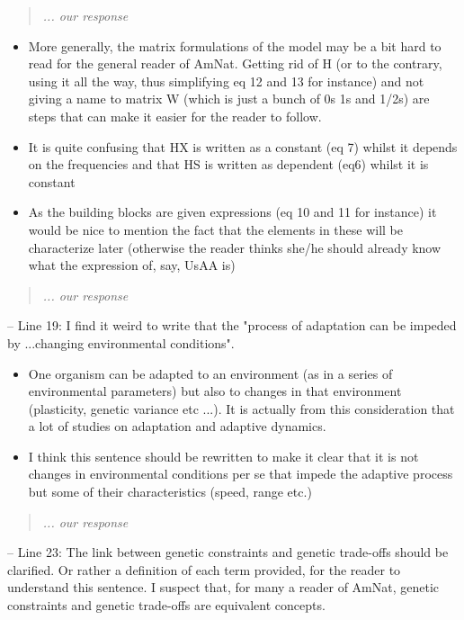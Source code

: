 \documentclass[11pt]{article}
\begin{document}
\begin{quote}
	{\itshape ... our response}
\end{quote}


\begin{itemize}
	\item More generally, the matrix formulations of the model may be a bit hard to read for the general reader of AmNat. Getting rid of H (or to the contrary, using it all the way, thus simplifying eq 12 and 13 for instance) and not giving a name to matrix W (which is just a bunch of 0s 1s and 1/2s) are steps that can make it easier for the reader to follow.
	\item It is quite confusing that HX is written as a constant (eq 7) whilst it depends on the frequencies and that HS is written as dependent (eq6) whilst it is constant
	\item As the building blocks are given expressions (eq 10 and 11 for instance) it would be nice to mention the fact that the elements in these will be characterize later (otherwise the reader thinks she/he should already know what the expression of, say, UsAA is)
\end{itemize}

\begin{quote}
	{\itshape ... our response}
\end{quote}
\noindent -- Line 19: I find it weird to write that the "process of adaptation can be impeded by ...changing environmental conditions".

\begin{itemize}
	\item One organism can be adapted to an environment (as in a series of environmental parameters) but also to changes in that environment (plasticity, genetic variance etc ...). It is actually from this consideration that a lot of studies on adaptation and adaptive dynamics.
	\item I think this sentence should be rewritten to make it clear that it is not changes in environmental conditions per se that impede the adaptive process but some of their characteristics (speed, range etc.)
\end{itemize}

\begin{quote}
	{\itshape ... our response}
\end{quote}


\noindent -- Line 23: The link between genetic constraints and genetic trade-offs should be clarified. Or rather a definition of each term provided, for the reader to understand this sentence. I suspect that, for many a reader of AmNat, genetic constraints and genetic trade-offs are equivalent concepts.
\end{document}
